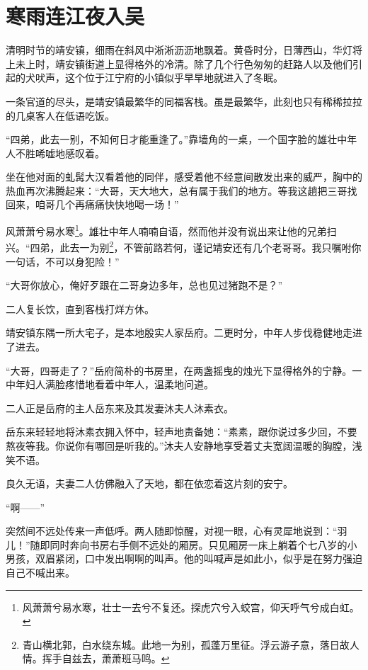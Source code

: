 \chapter{寒雨连江夜入吴}
\label{chap:han-yu-lian-jiang-ye-ru-wu}


清明时节的靖安镇，细雨在斜风中淅淅沥沥地飘着。黄昏时分，日薄西山，华灯将上未上时，靖安镇街道上显得格外的冷清。除了几个行色匆匆的赶路人以及他们引起的犬吠声，这个位于江宁府的小镇似乎早早地就进入了冬眠。

一条官道的尽头，是靖安镇最繁华的同福客栈。虽是最繁华，此刻也只有稀稀拉拉的几桌客人在低语吃饭。

“四弟，此去一别，不知何日才能重逢了。”靠墙角的一桌，一个国字脸的雄壮中年人不胜唏嘘地感叹着。

坐在他对面的虬髯大汉看着他的同伴，感受着他不经意间散发出来的威严，胸中的热血再次沸腾起来：“大哥，天大地大，总有属于我们的地方。等我这趟把三哥找回来，咱哥几个再痛痛快快地喝一场！”

风萧萧兮易水寒\footnote{风萧萧兮易水寒，壮士一去兮不复还。探虎穴兮入蛟宫，仰天呼气兮成白虹。}。雄壮中年人喃喃自语，然而他并没有说出来让他的兄弟扫兴。“四弟，此去一为别\footnote{青山横北郭，白水绕东城。此地一为别，孤蓬万里征。浮云游子意，落日故人情。挥手自兹去，萧萧班马鸣。}，不管前路若何，谨记靖安还有几个老哥哥。我只嘱咐你一句话，不可以身犯险！”

“大哥你放心，俺好歹跟在二哥身边多年，总也见过猪跑不是？”

二人复长饮，直到客栈打烊方休。

\splitline

靖安镇东隅一所大宅子，是本地殷实人家岳府。二更时分，中年人步伐稳健地走进了进去。

“大哥，四哥走了？”岳府简朴的书房里，在两盏摇曳的烛光下显得格外的宁静。一中年妇人满脸疼惜地看着中年人，温柔地问道。

二人正是岳府的主人岳东来及其发妻沐夫人沐素衣。

岳东来轻轻地将沐素衣拥入怀中，轻声地责备她：“素素，跟你说过多少回，不要熬夜等我。你说你有哪回是听我的。”沐夫人安静地享受着丈夫宽阔温暖的胸膛，浅笑不语。

良久无语，夫妻二人仿佛融入了天地，都在依恋着这片刻的安宁。

“啊------”

突然间不远处传来一声低呼。两人随即惊醒，对视一眼，心有灵犀地说到：“羽儿！”随即同时奔向书房右手侧不远处的厢房。只见厢房一床上躺着个七八岁的小男孩，双眉紧闭，口中发出啊啊的叫声。他的叫喊声是如此小，似乎是在努力强迫自己不喊出来。

